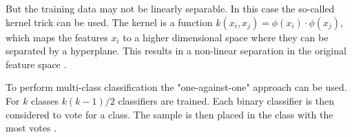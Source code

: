 But the training data may not be linearly separable. In this case the so-called kernel trick can be used. The kernel is a function \(k\left ( x_{i}, x_{j} \right )=\phi \left ( x_{i} \right )\cdot \phi\left ( x_{j} \right )\), which maps the features \(x_{i}\) to a higher dimensional space where they can be separated by a hyperplane. This results in a non-linear separation in the original feature space \cite{ErikKimKernelTrick}.

To perform multi-class classification the "one-against-one" approach can be used. For \(k\) classes \(k\left ( k-1 \right )/2\) classifiers are trained. Each binary classifier is then considered to vote for a class. The sample is then placed in the class with the most votes \cite{chang2011libsvm}.
